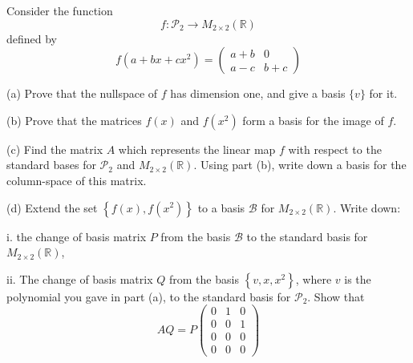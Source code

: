 \begin{question}{}{}
	Consider the function
	$$
	f: \mathcal{P}_{2} \longrightarrow M_{2 \times 2}(\mathbb{R})
	$$
	defined by
	$$
	f\left(a+b x+c x^{2}\right)=\left(\begin{array}{cc}
		a+b & 0 \\
		a-c & b+c
	\end{array}\right)
	$$
	
	(a) Prove that the nullspace of $f$ has dimension one, and give a basis $\{v\}$ for it.
	
	(b) Prove that the matrices $f(x)$ and $f\left(x^{2}\right)$ form a basis for the image of $f$.
	
	(c) Find the matrix $A$ which represents the linear map $f$ with respect to the standard bases for $\mathcal{P}_{2}$ and $M_{2 \times 2}(\mathbb{R})$.
	Using part (b), write down a basis for the column-space of this matrix.
	
	(d) Extend the set $\left\{f(x), f\left(x^{2}\right)\right\}$ to a basis $\mathcal{B}$ for $M_{2 \times 2}(\mathbb{R})$.
	Write down:
	
	i. the change of basis matrix $P$ from the basis $\mathcal{B}$ to the standard basis for $M_{2 \times 2}(\mathbb{R})$,
	
	ii. The change of basis matrix $Q$ from the basis $\left\{v, x, x^{2}\right\}$, where $v$ is the polynomial you gave in part (a), to the standard basis for $\mathcal{P}_{2}$.
	Show that
	$$
	AQ=P\left(\begin{array}{lll}
		0 & 1 & 0 \\
		0 & 0 & 1 \\
		0 & 0 & 0 \\
		0 & 0 & 0
	\end{array}\right)
	$$
\end{question}
